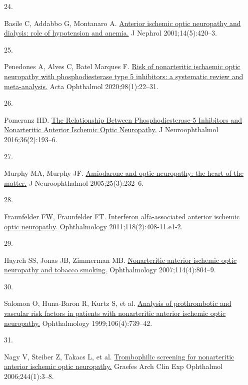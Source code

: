 \documentclass[
  11pt,
]{article}
\newlength{\cslhangindent}
\newlength{\csllabelwidth}
\newenvironment{CSLReferences}[2] %
 {\begin{list}{}{%
  \setlength{\itemindent}{0pt}
  \setlength{\leftmargin}{0pt}
  \setlength{\parsep}{0pt}
  \ifodd #1
   \setlength{\leftmargin}{\cslhangindent}
   \setlength{\itemindent}{-1\cslhangindent}
  \fi
  \setlength{\itemsep}{#2\baselineskip}}}
 {\end{list}}
\newcommand{\CSLLeftMargin}[1]{\parbox[t]{\csllabelwidth}{\strut#1\strut}}
\newcommand{\CSLRightInline}[1]{\parbox[t]{\linewidth - \csllabelwidth}{\strut#1\strut}}
\begin{document}
\begin{CSLReferences}{0}{1}
\CSLLeftMargin{24. }%
\CSLRightInline{Basile C, Addabbo G, Montanaro A. \href{}{{Anterior
ischemic optic neuropathy and dialysis: role of hypotension and
anemia.}} J Nephrol 2001;14(5):420--3. }

\CSLLeftMargin{25. }%
\CSLRightInline{Penedones A, Alves C, Batel Marques F.
\href{https://doi.org/10.1111/aos.14253}{{Risk of nonarteritic ischaemic
optic neuropathy with phosphodiesterase type 5 inhibitors: a systematic
review and meta-analysis.}} Acta Ophthalmol 2020;98(1):22--31. }

\CSLLeftMargin{26. }%
\CSLRightInline{Pomeranz HD.
\href{https://doi.org/10.1097/WNO.0000000000000299}{{The Relationship
Between Phosphodiesterase-5 Inhibitors and Nonarteritic Anterior
Ischemic Optic Neuropathy.}} J Neuroophthalmol 2016;36(2):193--6. }

\CSLLeftMargin{27. }%
\CSLRightInline{Murphy MA, Murphy JF.
\href{https://doi.org/10.1097/01.wno.0000177290.09649.38}{{Amiodarone
and optic neuropathy: the heart of the matter.}} J Neuroophthalmol
2005;25(3):232--6. }

\CSLLeftMargin{28. }%
\CSLRightInline{Fraunfelder FW, Fraunfelder FT.
\href{https://doi.org/10.1016/j.ophtha.2010.03.063}{{Interferon
alfa-associated anterior ischemic optic neuropathy.}} Ophthalmology
2011;118(2):408-11.e1-2. }

\CSLLeftMargin{29. }%
\CSLRightInline{Hayreh SS, Jonas JB, Zimmerman MB.
\href{https://doi.org/10.1016/j.ophtha.2006.07.062}{{Nonarteritic
anterior ischemic optic neuropathy and tobacco smoking.}} Ophthalmology
2007;114(4):804--9. }

\CSLLeftMargin{30. }%
\CSLRightInline{Salomon O, Huna-Baron R, Kurtz S, et al.
\href{https://doi.org/10.1016/S0161-6420(99)90159-8}{{Analysis of
prothrombotic and vascular risk factors in patients with nonarteritic
anterior ischemic optic neuropathy.}} Ophthalmology 1999;106(4):739--42.
}

\CSLLeftMargin{31. }%
\CSLRightInline{Nagy V, Steiber Z, Takacs L, et al.
\href{https://doi.org/10.1007/s00417-005-1154-5}{{Trombophilic screening
for nonarteritic anterior ischemic optic neuropathy.}} Graefes Arch Clin
Exp Ophthalmol 2006;244(1):3--8. }


\end{CSLReferences}
\end{document}
